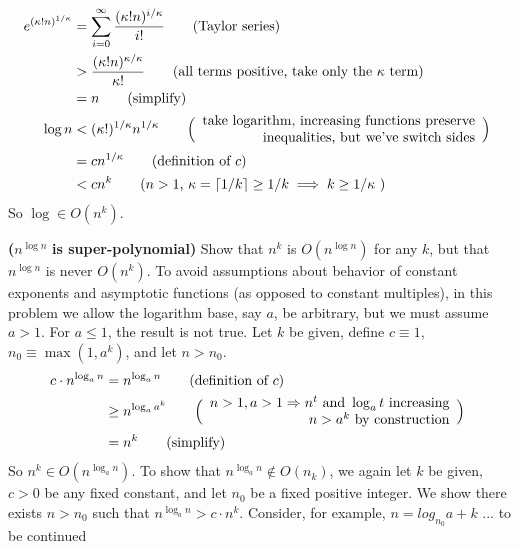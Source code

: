 \begin{align*}
  e^{(\kappa! n) ^{1/\kappa}} &= \sum_{i=0}^{\infty}\frac{(\kappa! n)^{i/\kappa}}{i!} \tag{Taylor series} \\
  &> \frac{(\kappa!n)^{\kappa/\kappa}}{\kappa!} \tag{all terms positive, take only the $\kappa$ term} \\
  &= n \tag{simplify} \\
  \log n &< (\kappa!)^{1/\kappa}n^{1/\kappa} \tag*{$\Bigl(\Bigr. \begin{array}{r}\text{take logarithm, increasing functions preserve}\\ \text{inequalities, but we've switch sides}\end{array} \Bigl.\Bigr)$ }\\
    &= c n^{1/\kappa} \tag{definition of $c$} \\
    &< c n^k \tag{$n>1$, $\kappa = \ceil{1/k}\geq 1/k \implies k \geq 1/\kappa$  }
\end{align*}
So $\log \in O(n^k)$.

 \textbf{(}$n^{\log n}$ \textbf{is super-polynomial)}  Show that $n^k$ is $O(n^{\log n})$ for any $k$, but that $n^{\log n}$ is never $O(n^k)$.
\Soln To avoid assumptions about behavior of constant exponents and asymptotic functions (as opposed to constant multiples), in this problem we allow the logarithm base, say $a$, be arbitrary, but we must assume $a > 1$.  For $a \leq 1$, the result is not true.  Let $k$ be given, define $c\equiv1$, $n_0\equiv \max(1,a^k)$, and let $n>n_0$.
\begin{align*}
  c\cdot n^{\log_a n} &= n^{\log_a n} \tag{definition of $c$} \\
  & \geq n^{\log_a a^k} \tag*{$\Bigl(\Bigr. \begin{array}{r}n>1, a>1 \Rightarrow n^t \text{ and } \log_a t \text{ increasing} \\ n>a^k \text{ by construction} \end{array} \Bigl.\Bigr)$ }\\
  &= n^k \tag{simplify}
\end{align*}
So $n^k\in O(n^{\log_a n})$.  To show that $n^{\log_a n} \not\in O(n_k)$, we again let $k$ be given, $c>0$ be any fixed constant, and let $n_0$ be a fixed positive integer.  We show there exists $n > n_0$ such that $n^{\log_a n} > c\cdot n^k$.  Consider, for example, $n=log_{n_0} a + k$ ... to be continued


